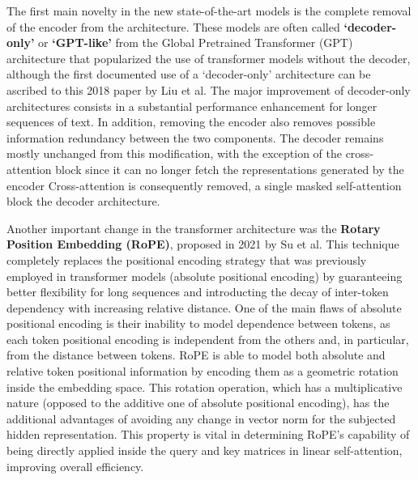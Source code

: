 The first main novelty in the new state-of-the-art models is the complete removal of the encoder from the architecture.
These models are often called \textbf{`decoder-only'} or \textbf{`GPT-like'} from the Global Pretrained Transformer (GPT) architecture  that popularized the use of transformer models without the decoder, although the first documented use of a `decoder-only' architecture can be ascribed to this 2018 paper by Liu et al. 
The major improvement of decoder-only architectures consists in a substantial performance enhancement for longer sequences of text.
In addition, removing the encoder also removes possible information redundancy between the two components.
The decoder remains mostly unchanged from this modification, with the exception of the cross-attention block since it can no longer fetch the representations generated by the encoder
Cross-attention is consequently removed,  a single masked self-attention block  the decoder architecture.

Another important change in the transformer architecture was the \textbf{Rotary Position Embedding (RoPE)}, proposed in 2021 by Su et al. 
This technique completely replaces the positional encoding strategy that was previously employed in transformer models (absolute positional encoding) by guaranteeing better flexibility for long sequences and introducting the decay of inter-token dependency with increasing relative distance.
One of the main flaws of absolute positional encoding is their inability to model dependence between tokens, as each token positional encoding is independent from the others and, in particular, from the distance between tokens.
RoPE is able to model both absolute and relative token positional information by encoding them as a geometric rotation inside the embedding space.
This rotation operation, which has a multiplicative nature (opposed to the additive one of absolute positional encoding), has the additional advantages of avoiding any change in vector norm for the subjected hidden representation.
This property is vital in determining RoPE's capability of being directly applied inside the query and key matrices in linear self-attention, improving overall efficiency.


